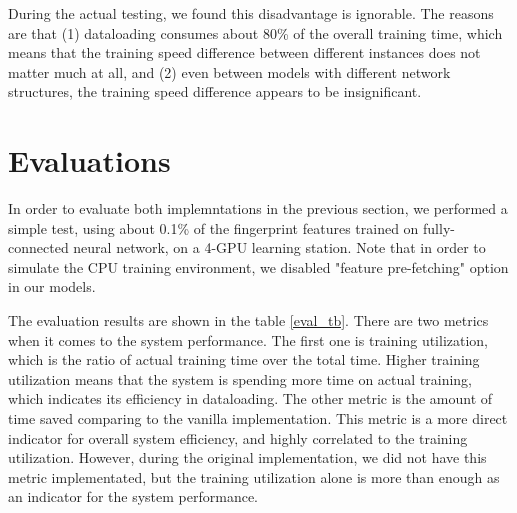 \documentclass[conference]{IEEEtran}
\begin{document}
During the actual testing, we found this disadvantage is ignorable. The reasons are that (1) dataloading consumes about 80\% of the overall training time, which means that the training speed difference between different instances does not matter much at all, and (2) even between models with different network structures, the training speed difference appears to be insignificant. 

\section{Evaluations} \label{sec_eval}

In order to evaluate both implemntations in the previous section, we performed a simple test, using about 0.1\% of the fingerprint features trained on fully-connected neural network, on a 4-GPU learning station. 
Note that in order to simulate the CPU training environment, we disabled "feature pre-fetching" option in our models. 

The evaluation results are shown in the table \ref{eval_tb}. 
There are two metrics when it comes to the system performance. 
The first one is training utilization, which is the ratio of actual training time over the total time. 
Higher training utilization means that the system is spending more time on actual training, which indicates its efficiency in dataloading. 
The other metric is the amount of time saved comparing to the vanilla implementation. 
This metric is a more direct indicator for overall system efficiency, and highly correlated to the training utilization. 
However, during the original implementation, we did not have this metric implementated, but the training utilization alone is more than enough as an indicator for the system performance. 
\end{document}
